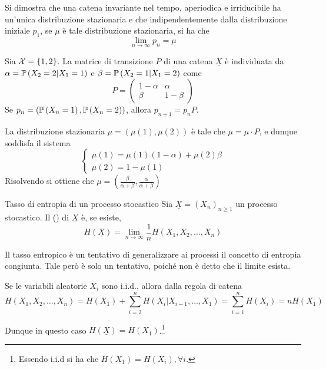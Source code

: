 Si dimostra che una catena invariante nel tempo, aperiodica e irriducibile ha un'unica distribuzione stazionaria e che indipendentemente dalla distribuzione iniziale \(p_1\), se \(\mu\) è tale distribuzione stazionaria, si ha che \[\lim_{n\to\infty} p_n = \mu\]

\begin{example}{}
  Sia \(\mathcal{X} = \set{1,2}\). La matrice di transizione \(P\) di una catena \(\underline{X}\) è individuata da \(\alpha = \Prob[X_2 = 2 | X_1 = 1]\) e \(\beta = \Prob[X_2 = 1 | X_1 = 2]\) come
  \begin{equation*}
    P = \begin{pmatrix}
      1-\alpha & \alpha \\
      \beta & 1-\beta
    \end{pmatrix}
  \end{equation*}
  Se \(p_n = (\Prob[X_n = 1], \Prob[X_n = 2])\), allora \(p_{n+1} = p_n P\).

  La distribuzione stazionaria \(\mu = (\mu(1), \mu(2))\) è tale che \(\mu = \mu \cdot P\), e dunque soddisfa il sistema
  \begin{equation*}
    \begin{cases}
      \mu(1) = \mu(1)(1-\alpha) + \mu(2) \beta \\
      \mu(2) = 1 - \mu(1)
    \end{cases}
  \end{equation*}
  Risolvendo si ottiene che \(\mu = \left(\frac{\beta}{\alpha+\beta}, \frac{\alpha}{\alpha+\beta}\right)\)
\end{example}

\begin{definition}{Tasso di entropia di un processo stocastico}
  Sia \(\underline{X} = {(X_n)}_{n\geq 1}\) un processo stocastico.
  Il  () di \(\underline{X}\) è, se esiste,
  \[H(\underline{X}) = \lim_{n\to\infty} \frac{1}{n} H(X_1, X_2, \ldots, X_n)\]
\end{definition}

Il tasso entropico è un tentativo di generalizzare ai processi il concetto di entropia congiunta.
Tale però è solo un tentativo, poiché non è detto che il limite esista.

Se le variabili aleatorie \(X_i\) sono i.i.d., allora dalla regola di catena
  \[H(X_1, X_2, \ldots, X_n) = H(X_1) + \sum_{i=2}^n H(X_i|X_{i-1}, \ldots, X_1) = \sum_{i=1}^n H(X_i) = n H(X_1)\]

Dunque in questo caso \(H(\underline{X}) = H(X_1)\).\footnote{Essendo i.i.d si ha che \(H(X_1) = H(X_i), \forall i\).}

